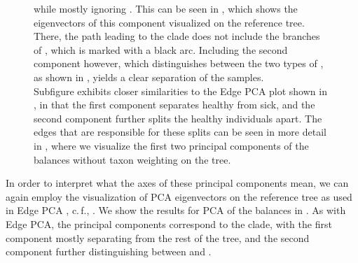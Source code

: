 \begin{figure}[!htb]
{        while mostly ignoring .
        This can be seen in ,
        which shows the eigenvectors of this component visualized on the reference tree.
        There, the path leading to the  clade
        does not include the branches of , which is marked with a black arc.
        Including the second component however, which distinguishes between the two types of ,
        as shown in ,
        yields a clear separation of the samples.
        \\
        Subfigure 
        exhibits closer similarities to the Edge PCA plot shown in ,
        in that the first component separates healthy from sick,
        and the second component further splits the healthy individuals apart.
        The edges that are responsible for these splits can be seen in more detail
        in ,
        where we visualize the first two principal components of the balances without taxon weighting on the tree.
    }
    \label{fig:bv_place_edge_balances_pca_scatter}
\end{figure}

In order to interpret what the axes of these principal components mean,
we can again employ the visualization of PCA eigenvectors on the reference tree as used in Edge PCA \cite{Matsen2011a},
c.\,f., .
We show the results for PCA of the balances in .
As with Edge PCA, the principal components correspond to the  clade,
with the first component mostly separating  from the rest of the tree,
and the second component further distinguishing
between  and .


